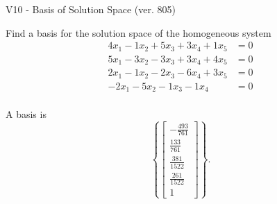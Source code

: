 \begin{exercise}
  \begin{exerciseTitle}V10 - Basis of Solution Space (ver. 805)\end{exerciseTitle}
  \begin{exerciseStatement}
    Find a basis for the solution space of the homogeneous system 
\begin{align*}
 4 x_ 1 -1 x_ 2 + 5 x_ 3 + 3 x_ 4 + 1 x_ 5 &= 0  \\ 
  5 x_ 1 -3 x_ 2 -3 x_ 3 + 3 x_ 4 + 4 x_ 5 &= 0  \\ 
  2 x_ 1 -1 x_ 2 -2 x_ 3 -6 x_ 4 + 3 x_ 5 &= 0  \\ 
  -2 x_ 1 -5 x_ 2 -1 x_ 3 -1 x_ 4 &= 0  \\ 
 \end{align*}


 
  \end{exerciseStatement}

  \begin{exerciseAnswer}
   A basis is   
\[\left\{\left[\begin{array}{c}
-\frac{493}{761} \\
\frac{133}{761} \\
\frac{381}{1522} \\
\frac{261}{1522} \\
1
\end{array}\right]\right\}.\]

  


  \end{exerciseAnswer}
\end{exercise}